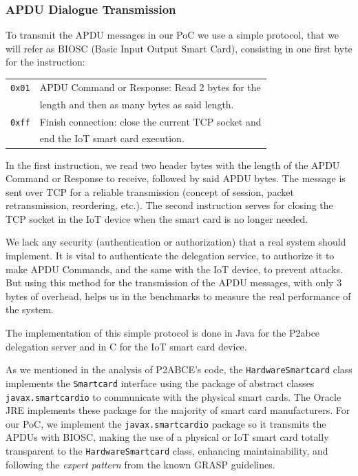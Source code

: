 \documentclass[journal]{IEEEtran}
\begin{document}
\subsubsection{APDU Dialogue Transmission}


To transmit the APDU messages in our PoC we use a simple protocol, that we will refer as BIOSC (Basic Input Output Smart Card), consisting in one first byte for the instruction: 

\hfil

\begin{tabular}{|c|l|}
	\hline
	\texttt{0x01} & APDU Command or Response: Read 2 bytes for the\\& length and then as many bytes as said length. \\
	\hline
	\texttt{0xff} & Finish connection: close the current TCP socket and\\& end the IoT smart card execution. \\
	\hline
\end{tabular}

\hfil

In the first instruction, we read two header bytes with the length of the APDU Command or Response to receive, followed by said APDU bytes. The message is sent over TCP for a reliable transmission (concept of session, packet retransmission, reordering, etc.). The second instruction serves for closing the TCP socket in the IoT device when the smart card is no longer needed.

We lack any security (authentication or authorization) that a real system should implement. It is vital to authenticate the delegation service, to authorize it to make APDU Commands, and the same with the IoT device, to prevent attacks. But using this method for the transmission of the APDU messages, with only 3 bytes of overhead, helps us in the  benchmarks to measure the real performance of the system.


\hfil


The implementation of this simple protocol is done in Java for the P2abce delegation server and in C for the IoT smart card device.



\hfil

As we mentioned in the analysis of P2ABCE's code, the \texttt{HardwareSmartcard} class implements the \texttt{Smartcard} interface using the package of abstract classes \texttt{javax.smartcardio} to communicate with the physical smart cards. The Oracle JRE implements these package for the majority of smart card manufacturers. For our PoC, we implement the \texttt{javax.smartcardio} package so it transmits the APDUs with BIOSC, making the use of a physical or IoT smart card totally transparent to the \texttt{HardwareSmartcard} class, enhancing maintainability, and following the \textit{expert pattern} from the known GRASP guidelines.
\end{document}
